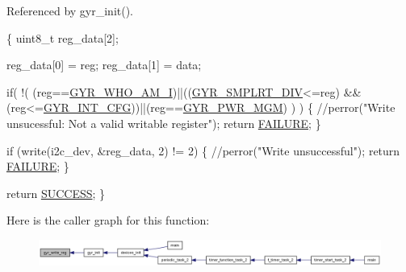 Referenced by gyr\-\_\-init().


\begin{DoxyCode}
\{
  uint8\_t reg\_data[2];

  reg\_data[0] = reg;
  reg\_data[1] = data;

  \textcolor{keywordflow}{if}( !( (reg==\hyperlink{imu__regs_8h_ab2499ff4167376accdbdec09f5e1b021}{GYR\_WHO\_AM\_I})||((\hyperlink{imu__regs_8h_a04a18568e6e39825c98be5ec2976bec4}{GYR\_SMPLRT\_DIV}<=reg)
      &&(reg<=\hyperlink{imu__regs_8h_ad0b8386ab023e17beb305025abf96e18}{GYR\_INT\_CFG}))||(reg==\hyperlink{imu__regs_8h_a5eba4af610a1ec85320e940bf44855eb}{GYR\_PWR\_MGM}) ) )
  \{
      \textcolor{comment}{//perror("Write unsucessful: Not a valid writable register");}
      \textcolor{keywordflow}{return} \hyperlink{calibration_2calibration_8h_a6d58f9ac447476b4e084d7ca383f5183}{FAILURE};
  \}
        
  \textcolor{keywordflow}{if} (write(i2c\_dev, &reg\_data, 2) != 2) \{               
          \textcolor{comment}{//perror("Write unsuccessful");}
          \textcolor{keywordflow}{return} \hyperlink{calibration_2calibration_8h_a6d58f9ac447476b4e084d7ca383f5183}{FAILURE};
  \}

  \textcolor{keywordflow}{return} \hyperlink{calibration_2calibration_8h_aa90cac659d18e8ef6294c7ae337f6b58}{SUCCESS};
\}
\end{DoxyCode}


Here is the caller graph for this function\-:
\nopagebreak
\begin{figure}[H]
\begin{center}
\leavevmode
\includegraphics[width=350pt]{group__gyr_ga3eba167b8ab0614bfe7bafeae8b5570d_icgraph}
\end{center}
\end{figure}


